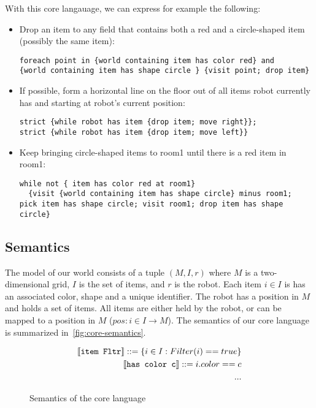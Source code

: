 With this core langauage, we can express for example the following:
\begin{itemize}
	\item Drop an item to any field that contains both a red and a circle-shaped item
    (possibly the same item):
    \begin{lstlisting}
foreach point in {world containing item has color red} and
{world containing item has shape circle } {visit point; drop item}
	   \end{lstlisting}

  \item If possible, form a horizontal line on the floor out of all items robot
    currently has and starting at robot's current position:
    \begin{lstlisting}
strict {while robot has item {drop item; move right}};
strict {while robot has item {drop item; move left}}
    \end{lstlisting}

	\item Keep bringing circle-shaped items to room1 until there is a red item in room1:
    \begin{lstlisting}
while not { item has color red at room1}
  {visit {world containing item has shape circle} minus room1;
pick item has shape circle; visit room1; drop item has shape circle}
    \end{lstlisting}
\end{itemize}


\subsection{Semantics}

The model of our world consists of a tuple $(M, I, r)$ where
$M$ is a two-dimensional grid, $I$ is the set of items, and $r$ is the robot.
Each item $i \in I$ is has an associated color, shape and a unique identifier.
The robot has a position in $M$ and holds a set of items. All items are either held by
the robot, or can be mapped to a position in $M$ ($pos: i \in I \to M$).
The semantics of our core language is summarized in~\autoref{fig:core-semantics}.
\begin{figure}
  \begin{align*}
  \llbracket \texttt{item Fltr}\rrbracket ::= \{i \in I: Filter(i) == true \} \\
  \llbracket \texttt{has color c}\rrbracket ::= i.color == c\\
  ...
  \end{align*}
  \caption{Semantics of the core language}
  \label{fig:core-semantics}
\end{figure}
